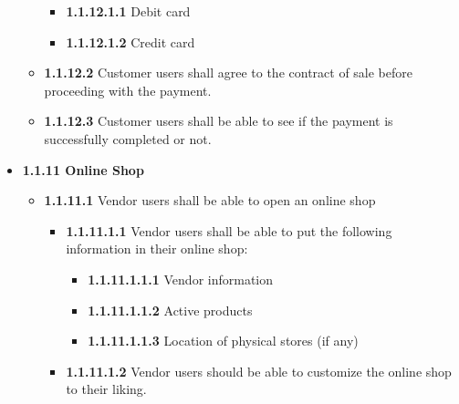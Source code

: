 \documentclass[]{article}
\providecommand{\tightlist}{%
  \setlength{\itemsep}{0pt}\setlength{\parskip}{0pt}}
\begin{document}
\begin{itemize}
\begin{itemize}
                    \begin{itemize}
                        \tightlist
                        \item
                              \textbf{1.1.12.1.1} Debit card
                        \item
                              \textbf{1.1.12.1.2} Credit card
                    \end{itemize}
              \item
                    \textbf{1.1.12.2} Customer users shall agree to the contract of sale
                    before proceeding with the payment.
              \item
                    \textbf{1.1.12.3} Customer users shall be able to see if the payment
                    is successfully completed or not.
          \end{itemize}
    \item
          \textbf{1.1.11 Online Shop}

          \begin{itemize}
              \tightlist
              \item
                    \textbf{1.1.11.1} Vendor users shall be able to open an online shop

                    \begin{itemize}
                        \tightlist
                        \item
                              \textbf{1.1.11.1.1} Vendor users shall be able to put the
                              following information in their online shop:

                              \begin{itemize}
                                  \tightlist
                                  \item
                                        \textbf{1.1.11.1.1.1} Vendor information
                                  \item
                                        \textbf{1.1.11.1.1.2} Active products
                                  \item
                                        \textbf{1.1.11.1.1.3} Location of physical stores (if any)
                              \end{itemize}
                        \item
                              \textbf{1.1.11.1.2} Vendor users should be able to customize the
                              online shop to their liking.
                    \end{itemize}
          \end{itemize}
\end{itemize}
\end{document}
